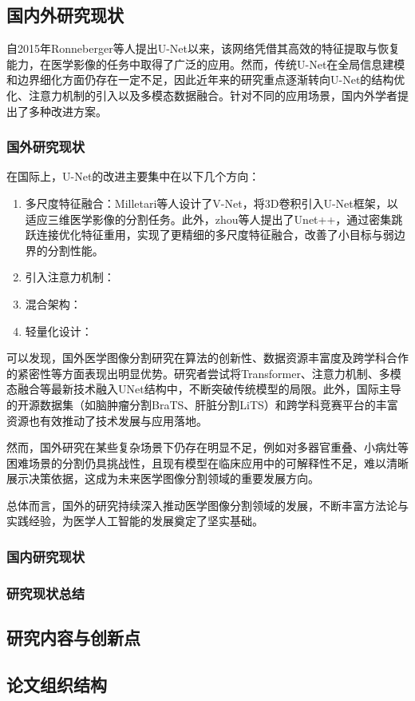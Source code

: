 \subsection{国内外研究现状}

自2015年Ronneberger等人提出U-Net以来，该网络凭借其高效的特征提取与恢复能力，在医学影像的任务中取得了广泛的应用。然而，传统U-Net在全局信息建模和边界细化方面仍存在一定不足，因此近年来的研究重点逐渐转向U-Net的结构优化、注意力机制的引入以及多模态数据融合。针对不同的应用场景，国内外学者提出了多种改进方案。

\subsubsection{国外研究现状}

在国际上，U-Net的改进主要集中在以下几个方向\cite{azad2024}：

\begin{enumerate}
    \item 多尺度特征融合：Milletari等人\cite{milletari2016}设计了V-Net，将3D卷积引入U-Net框架，以适应三维医学影像的分割任务。此外，zhou等人\cite{zhou2018}提出了Unet++，通过密集跳跃连接优化特征重用，实现了更精细的多尺度特征融合，改善了小目标与弱边界的分割性能。
    \item 引入注意力机制：
    \item 混合架构：
    \item 轻量化设计：
\end{enumerate}

可以发现，国外医学图像分割研究在算法的创新性、数据资源丰富度及跨学科合作的紧密性等方面表现出明显优势。研究者尝试将Transformer、注意力机制、多模态融合等最新技术融入UNet结构中，不断突破传统模型的局限。此外，国际主导的开源数据集（如脑肿瘤分割BraTS、肝脏分割LiTS）和跨学科竞赛平台的丰富资源也有效推动了技术发展与应用落地。

然而，国外研究在某些复杂场景下仍存在明显不足，例如对多器官重叠、小病灶等困难场景的分割仍具挑战性，且现有模型在临床应用中的可解释性不足，难以清晰展示决策依据，这成为未来医学图像分割领域的重要发展方向。

总体而言，国外的研究持续深入推动医学图像分割领域的发展，不断丰富方法论与实践经验，为医学人工智能的发展奠定了坚实基础。

\subsubsection{国内研究现状}

\subsubsection{研究现状总结}

\subsection{研究内容与创新点}


\subsection{论文组织结构}
